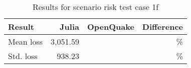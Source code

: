 \begin{table}[htbp]

\centering
\begin{tabular}{ l r r r }

\hline
\rowcolor{anti-flashwhite}
\bf{Result} & \bf{Julia} & \bf{OpenQuake} & \bf{Difference}\\
\hline
Mean loss & 3,051.59 &  & \% \\
Std. loss & 938.23 &  & \% \\
\hline
\end{tabular}

\caption{Results for scenario risk test case 1f}
\label{tab:result-sr-1f}
\end{table}
